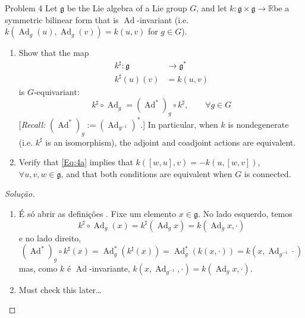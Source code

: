 \begin{idea4}{Problem 4}\leavevmode
	Let $\mathfrak{g}$ be the Lie algebra of a Lie group $G$, and let  $k:\mathfrak{g} \times \mathfrak{g}\to \mathbb{R}$be a symmetric bilinear form that is $\operatorname{Ad}$-invariant (i.e. $k(\operatorname{Ad}_g(u),\operatorname{Ad}_g(v))=k(u,v)$ for $g\in G$).
	\begin{enumerate}[label=\alph*.]
		\item Show that the map
			\begin{equation}\label{Eq:4a}\begin{aligned}
				k^\sharp:\mathfrak{g}  &\longrightarrow \mathfrak{g}^* \\
				k^\sharp(u)(v) &=k(u,v)\end{aligned}
			\end{equation}
			is $G$-equivariant:
			\[k^\sharp \circ \operatorname{Ad}_g=(\operatorname{Ad}^*)_g\circ k^\sharp,\qquad \forall g\in G\]
			[\textit{Recall:} $(\operatorname{Ad}^* )_g:=(\operatorname{Ad}_{g^{-1}})^*$.] In particular, when $k$ is nondegenerate (i.e. $k^\sharp$ is an isomorphism), the adjoint and coadjoint actions are equivalent.

		\item Verify that \cref{Eq:4a} implies that $k([w,u],v)=-k(u,[w,v])$,  $\forall u,v,w\in\mathfrak{g}$, and that both conditions are equivalent when $G$ is connected.
	\end{enumerate}
\end{idea4}

\begin{proof}[Solução]
	\begin{enumerate}[label=\alph*.]
		\item É só abrir as definições . Fixe um elemento $x\in\mathfrak{g}$. No lado esquerdo, temos
			\[k^\sharp \circ \operatorname{Ad}_g(x)=k^\sharp(\operatorname{Ad}_gx)=k(\operatorname{Ad}_gx,\cdot )\]
			e no lado direito,
			\[(\operatorname{Ad}^* )_g\circ k^\sharp (x)=\operatorname{Ad}^*_g(k^\sharp (x))=\operatorname{Ad}^* _g(k(x,\cdot ))=k(x,\operatorname{Ad}_{g^{-1}}\cdot )\]
			mas, como $k$ é $\operatorname{Ad}$-invariante,
			$k(x,\operatorname{Ad}_{g^{-1}},\cdot )=k(\operatorname{Ad}_gx,\cdot )$.

		\item Must check this later…
	\end{enumerate}
\end{proof}

